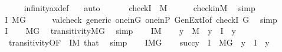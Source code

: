 \begin{isabellebody}
\ \ \ \ \isamarkupfalse%
\ infinity{\isacharunderscore}{\kern0pt}ax{\isacharunderscore}{\kern0pt}def\ \ \isamarkupfalse%
\ auto\isanewline
\ \ \isamarkupfalse%
\isanewline
\ \ \isamarkupfalse%
\ {\isachardoublequoteopen}check{\isacharparenleft}{\kern0pt}I{\isacharparenright}{\kern0pt}\ {\isasymin}\ M{\isachardoublequoteclose}\isanewline
\ \ \ \ \isamarkupfalse%
\ check{\isacharunderscore}{\kern0pt}in{\isacharunderscore}{\kern0pt}M\ \isamarkupfalse%
\ simp\isanewline
\ \ \isamarkupfalse%
\isanewline
\ \ \isamarkupfalse%
\ {\isachardoublequoteopen}I{\isasymin}\ M{\isacharbrackleft}{\kern0pt}G{\isacharbrackright}{\kern0pt}{\isachardoublequoteclose}\isanewline
\ \ \ \ \isamarkupfalse%
\ valcheck\ generic\ one{\isacharunderscore}{\kern0pt}in{\isacharunderscore}{\kern0pt}G\ one{\isacharunderscore}{\kern0pt}in{\isacharunderscore}{\kern0pt}P\ GenExtI{\isacharbrackleft}{\kern0pt}of\ {\isachardoublequoteopen}check{\isacharparenleft}{\kern0pt}I{\isacharparenright}{\kern0pt}{\isachardoublequoteclose}\ G{\isacharbrackright}{\kern0pt}\ \isamarkupfalse%
\ simp\isanewline
\ \ \isamarkupfalse%
\ {\isacartoucheopen}{}{\isasymin}I{\isacartoucheclose}\isanewline
\ \ \isamarkupfalse%
\ {\isachardoublequoteopen}{}{\isasymin}M{\isacharbrackleft}{\kern0pt}G{\isacharbrackright}{\kern0pt}{\isachardoublequoteclose}\ \isamarkupfalse%
\ transitivity{\isacharunderscore}{\kern0pt}MG\ \isamarkupfalse%
\ simp\isanewline
\ \ \isamarkupfalse%
\ {\isacartoucheopen}I{\isasymin}M{\isacartoucheclose}\isanewline
\ \ \isamarkupfalse%
\ {\isachardoublequoteopen}y\ {\isasymin}\ M{\isachardoublequoteclose}\ \ {\isachardoublequoteopen}y\ {\isasymin}\ I{\isachardoublequoteclose}\ \ y\isanewline
\ \ \ \ \isamarkupfalse%
\ \ transitivity{\isacharbrackleft}{\kern0pt}OF\ {\isacharunderscore}{\kern0pt}\ {\isacartoucheopen}I{\isasymin}M{\isacartoucheclose}{\isacharbrackright}{\kern0pt}\ that\ \isamarkupfalse%
\ simp\isanewline
\ \ \isamarkupfalse%
\ {\isacartoucheopen}I{\isasymin}M{\isacharbrackleft}{\kern0pt}G{\isacharbrackright}{\kern0pt}{\isacartoucheclose}\isanewline
\ \ \isamarkupfalse%
\ {\isachardoublequoteopen}succ{\isacharparenleft}{\kern0pt}y{\isacharparenright}{\kern0pt}\ {\isasymin}\ I\ {\isasyminter}\ M{\isacharbrackleft}{\kern0pt}G{\isacharbrackright}{\kern0pt}{\isachardoublequoteclose}\ \ {\isachardoublequoteopen}y\ {\isasymin}\ I{\isachardoublequoteclose}\ \ y\isanewline

\end{isabellebody}
